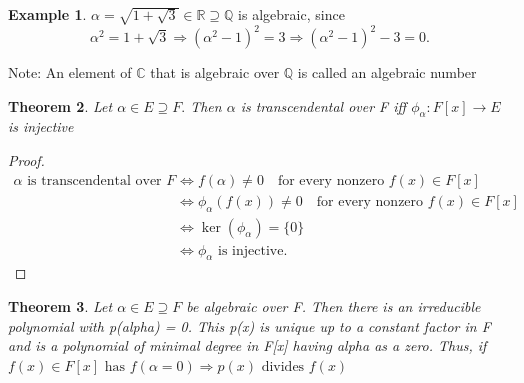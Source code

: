\documentclass[11pt]{article}
\newtheorem{theorem}{Theorem}[section]
\theoremstyle{definition}
\newtheorem{example}[theorem]{Example}
\theoremstyle{remark}
\begin{document}
\begin{example}
    $\alpha = \sqrt{1 + \sqrt{3}} \in \mathbb{R} \supseteq \mathbb{Q}$
is algebraic, since
\[
\alpha^2 = 1 + \sqrt{3}
\Rightarrow (\alpha^2 - 1)^2 = 3
\Rightarrow (\alpha^2 - 1)^2 - 3 = 0.
\]
\end{example}

Note: An element of $\mathbb{C}$ that is algebraic over $\mathbb{Q}$ is called an algebraic number 

\begin{theorem}
    Let $\alpha \in E \supseteq F.$ Then $\alpha$ is transcendental over F iff $\phi_{\alpha}:F[x] \rightarrow E$ is injective
\end{theorem}
\begin{proof}
    \[
\begin{aligned}
\alpha \text{ is transcendental over } F
&\iff f(\alpha) \neq 0 \quad \text{for every nonzero } f(x) \in F[x] \\
&\iff \phi_{\alpha}(f(x)) \neq 0 \quad \text{for every nonzero } f(x) \in F[x] \\
&\iff \ker(\phi_{\alpha}) = \{0\} \\
&\iff \phi_{\alpha} \text{ is injective}.
\end{aligned}
\]
\end{proof}

\begin{theorem}
Let $\alpha \in E \supseteq F$ be algebraic over F. Then there is an irreducible polynomial with p(alpha) = 0. This p(x) is unique up to a constant factor in F and is a polynomial of minimal degree in F[x] having alpha as a zero. Thus, if $f(x) \in F[x] \text{ has } f(\alpha = 0) \Rightarrow p(x) \text{ divides } f(x)$
\end{theorem}
\end{document}
